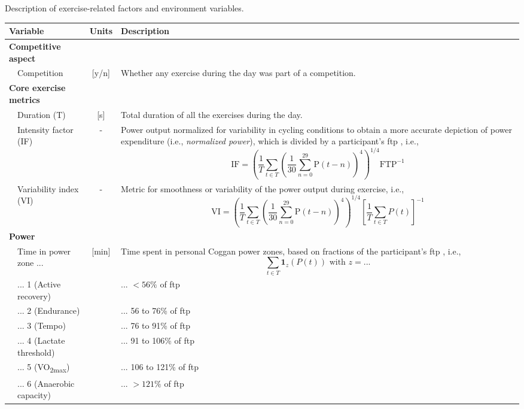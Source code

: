 \documentclass[11pt,a4paper]{article}
\begin{document}
\newpage
\renewcommand{\arraystretch}{1.25}
\begin{threeparttable}[hbtp]
    \caption[Description of exercise and environment variables]{Description of exercise-related factors and environment variables.}
    \label{tab:reg-variables}
    \footnotesize
    \centering
    \begin{tabular}{l p{3.5cm} c p{11.2cm}}
        \toprule
        \multicolumn{2}{l}{\textbf{Variable}} & \textbf{Units} & \textbf{Description}\\
        \midrule
        \multicolumn{2}{l}{\textbf{Competitive aspect}}\\
        & Competition & [y/n] & Whether any exercise during the day was part of a competition.\\
        \multicolumn{2}{l}{\textbf{Core exercise metrics}}\\
        & Duration (T) & [s] & Total duration of all the exercises during the day.\\
        & Intensity factor (IF) & - & Power output normalized for variability in cycling conditions to obtain a more accurate depiction of power expenditure (i.e., \textit{normalized power}), which is divided by a participant's \gls{ftp} \cite{1937716155}, i.e., \begin{equation}\text{IF} = \left( \frac{1}{T} \sum_{t\in T} \left( \frac{1}{30} \sum_{n=0}^{29} \text{P} (t-n) \right)^4\right)^{1/4} \text{FTP}^{-1}\end{equation}\\
        & Variability index (VI) & - & Metric for smoothness or variability of the power output during exercise, i.e., \begin{equation}\text{VI} = \left( \frac{1}{T} \sum_{t\in T} \left( \frac{1}{30} \sum_{n=0}^{29} \text{P} (t-n) \right)^4\right)^{1/4} \left[\frac{1}{T}\sum_{t\in T} P(t)\right]^{-1} \end{equation} \\

        \multicolumn{2}{l}{\textbf{Power}}\\
        & Time in power zone ... & [min] & Time spent in personal Coggan power zones, based on fractions of the participant's \gls{ftp} \cite{1937716155}, i.e., \begin{equation}\sum_{t\in T} \boldsymbol{1}_{z}(P(t)) \text{ with } z = ...\end{equation}\\
        & ... 1 (Active recovery) & & ... $<56\%$ of \gls{ftp}\\
        & ... 2 (Endurance) & & ... 56 to 76\% of \gls{ftp}\\
        & ... 3 (Tempo) & & ... 76 to 91\% of \gls{ftp}\\
        & ... 4 (Lactate threshold) & & ... 91 to 106\% of \gls{ftp}\\
        & ... 5 (VO\textsubscript{2max}) & & ... 106 to 121\% of \gls{ftp}\\
        & ... 6 (Anaerobic capacity) & & ... $>121\%$ of \gls{ftp}\\
        

\end{tabular}
\end{threeparttable}
\end{document}
